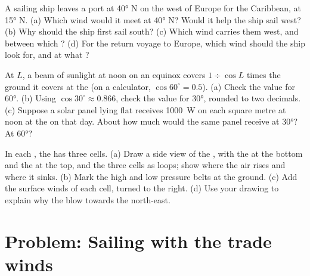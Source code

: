 \begin{exercise}[$\star\star$]\label{exo:g8:winds-global-circulation:10}
A sailing ship leaves a port at \ang{40} N on the west  of Europe
for the Caribbean, at \ang{15} N. (a) Which wind would it meet at
\ang{40} N? Would it help the ship sail west? (b) Why should the ship
first sail south? (c) Which wind carries them west, and between
which ? (d) For the return voyage to Europe, which wind should
the ship look for, and at what ?
\end{exercise}

\begin{exercise}[$\star\star\star$]\label{exo:g8:winds-global-circulation:11}
At  $L$, a beam of sunlight at noon on an equinox covers $1 \div
\cos L$ times the ground it covers at the  (on a calculator,
$\cos 60^\circ = 0.5$). (a) Check the value for \ang{60}. (b) Using
$\cos 30^\circ \approx 0.866$, check the value for \ang{30}, rounded to
two decimals. (c) Suppose a solar panel lying flat receives
\qty{1000}{W} on each square metre at noon at the  on that day.
About how much would the same panel receive at \ang{30}? At \ang{60}?
\end{exercise}

\begin{exercise}[$\star\star\star$]\label{exo:g8:winds-global-circulation:12}
In each , the  has three cells. (a) Draw a
side view of the , with the  at the bottom and
the  at the top, and the three cells as loops; show where the air
rises and where it sinks. (b) Mark the high and low pressure belts at
the ground. (c) Add the surface winds of each cell, turned to the right.
(d) Use your drawing to explain why the  blow towards the
north-east.
\end{exercise}

\section{Problem: Sailing with the trade winds}

